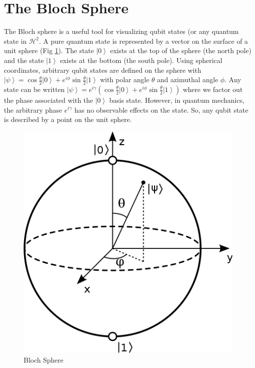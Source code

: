 \documentclass[11pt]{article} %
\newcommand{\ket}[1]{\left|#1\right\rangle}
\begin{document}
\section{The Bloch Sphere}\label{block_sphere}
The Bloch sphere is a useful tool for visualizing qubit states (or any quantum state in $\mathcal{H}^2$. A pure quantum state is represented by a vector on the surface of a unit sphere (Fig \ref{fig:bloch}). The state $\ket{0}$ exists at the top of the sphere (the north pole) and the state $\ket{1}$ exists at the bottom (the south pole). Using spherical coordinates, arbitrary qubit states are defined on the sphere with $\ket{\psi} = \cos\frac{\theta}{2}\ket{0} + e^{i\phi}\sin\frac{\theta}{2}\ket{1}$ with polar angle $\theta$ and azimuthal angle $\phi$. Any state can be written $\ket{\psi} = e^{i\gamma}\left(\cos\frac{\theta}{2}\ket{0} + e^{i\phi}\sin\frac{\theta}{2}\ket{1}\right)$ where we factor out the phase associated with the $\ket{0}$ basis state. However, in quantum mechanics, the arbitrary phase $e^{i\gamma}$ has no observable effects on the state. So, any qubit state is described by a point on the unit sphere.
\begin{figure}[Bloch Sphere]
  \includegraphics[scale=0.35]{Lecture3Figs/BlochSphere_diag.png}
  \caption{Bloch Sphere}
  \label{fig:bloch}
\end{figure}
\end{document}
